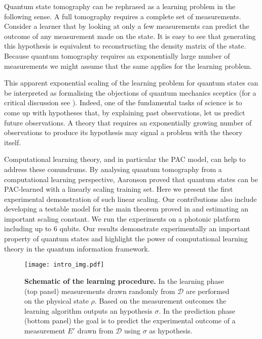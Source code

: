 \documentclass[aps,superscriptaddress,nofootinbib,twocolumn]{revtex4-1}
\begin{document}
Quantum state tomography can be rephrased as a learning problem in the following sense. A full tomography requires a complete set of measurements. Consider a learner that by looking at only a few measurements can predict the outcome of any measurement made on the state. It is easy to see that generating this hypothesis is equivalent to reconstructing the density matrix of the state. Because quantum tomography requires an exponentially large number of measurements we might assume that the same applies for the learning problem.

This apparent exponential scaling of the learning problem for quantum states can be interpreted as formalising the objections of quantum mechanics sceptics (for a critical discussion see \cite{aaronson2013quantum}). Indeed, one of the fundamental tasks of science is to come up with hypotheses that, by explaining past observations, let us predict future observations. A theory that requires an exponentially growing number of observations to produce its hypothesis may signal a problem with the theory itself.

Computational learning theory, and in particular the PAC model, can help to
address these conundrums. By analysing quantum tomography from a computational
learning perspective, Aaronson \cite{aaronson2007learnability} proved that
quantum states can be PAC-learned with a linearly scaling training set. Here we
present the first experimental demonstration of such linear scaling. Our
contributions also include developing a testable model for the main theorem
proved in \cite{aaronson2007learnability} and estimating an important scaling constant. We run the experiments on a
photonic platform including up to $6$ qubits.
Our results demonstrate experimentally an important property of quantum states
and highlight the power of computational learning theory in the quantum
information framework.


\begin{figure}
\centering
\texttt{[image: intro\_img.pdf]}
\caption{\textbf{Schematic of the learning procedure.} In the learning phase (top panel) measurements drawn randomly from $\mathcal{D}$ are performed on the physical state $\rho$. Based on the measurement outcomes the learning algorithm outputs an hypothesis $\sigma$. In the prediction phase (bottom panel) the goal is to predict the experimental outcome of a measurement $E'$ drawn from $\mathcal{D}$ using $\sigma$ as hypothesis. }
\label{fig:learnigSchematic}
\end{figure}
\end{document}
